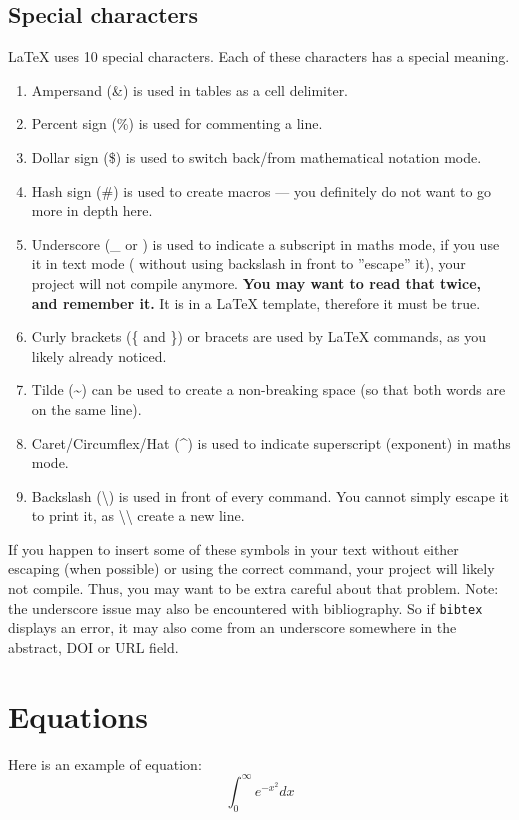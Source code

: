 \subsection{Special characters}
LaTeX uses 10 special characters. Each of these characters has a special meaning.
\begin{enumerate}
  \item Ampersand (\&) is used in tables as a cell delimiter.
  \item Percent sign (\%) is used for commenting a line.
  \item Dollar sign (\$) is used to switch back/from mathematical notation mode.
  \item Hash sign (\#) is used to create macros --- you definitely do not want to go more in depth here.
  \item Underscore (\_ or \textunderscore) is used to indicate a subscript in maths mode, if you use it in text mode ( without using backslash in front to ''escape'' it), your project will not compile anymore. \textbf{You may want to read that twice, and remember it.} It is in a LaTeX template, therefore it must be true.
  \item Curly brackets (\{ and \}) or bracets are used by LaTeX commands, as you likely already noticed.
  \item Tilde (\textasciitilde) can be used to create a non-breaking space (so that both words are on the same line).
  \item Caret/Circumflex/Hat (\textasciicircum) is used to indicate superscript (exponent) in maths mode.
  \item Backslash (\textbackslash) is used in front of every command. You cannot simply escape it to print it, as \textbackslash{}\textbackslash{} create a new line.
\end{enumerate}
If you happen to insert some of these symbols in your text without either escaping (when possible) or using the correct command, your project will likely not compile.
Thus, you may want to be extra careful about that problem.
Note: the underscore issue may also be encountered with bibliography.
So if \texttt{bibtex} displays an error, it may also come from an underscore somewhere in the abstract, DOI or URL field.

\section{Equations}
Here is an example of equation:
\begin{equation}
\int_0^\infty e^{-x^2} dx
\label{eq:eq1}
\end{equation}

